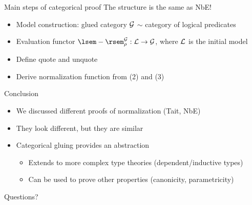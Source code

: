 \documentclass{beamer}
\begin{document}
\begin{frame}{Main steps of categorical proof}
The structure is the same as NbE!
\begin{itemize}
    \item Model construction: glued category $\mathcal{G}$ $\sim$ category of logical predicates
    \item Evaluation functor $\cint[\glueint]{-}[\gluecat] : \syncat \to \gluecat$, where $\mathcal{L}$ is the initial model
    \item Define quote and unquote
    \item Derive normalization function from (2) and (3)
\end{itemize}
\end{frame}

\begin{frame}{Conclusion}
\begin{itemize}
    \item We discussed different proofs of normalization (Tait, NbE)
    \item They look different, but they are similar
    \item Categorical gluing provides an abstraction
    \begin{itemize}
        \item Extends to more complex type theories (dependent/inductive types)
        \item Can be used to prove other properties (canonicity, parametricity)
    \end{itemize}
\end{itemize}
\end{frame}

\begin{frame}
\centering
\Large Questions?
\end{frame}
\end{document}
